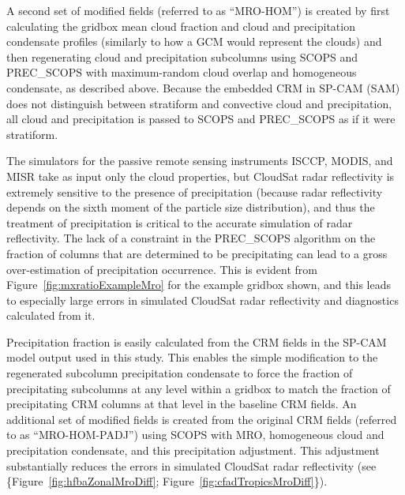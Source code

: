 A second set of modified fields (referred to as ``MRO-HOM'') is created
by first calculating the gridbox mean cloud fraction and cloud and
precipitation condensate profiles (similarly to how a GCM would
represent the clouds) and then regenerating cloud and precipitation
subcolumns using SCOPS and PREC\_SCOPS with maximum-random cloud overlap
and homogeneous condensate, as described above. Because the embedded CRM
in SP-CAM (SAM) does not distinguish between stratiform and convective
cloud and precipitation, all cloud and precipitation is passed to SCOPS
and PREC\_SCOPS as if it were stratiform.

The simulators for the passive remote sensing instruments ISCCP, MODIS,
and MISR take as input only the cloud properties, but CloudSat radar
reflectivity is extremely sensitive to the presence of precipitation
(because radar reflectivity depends on the sixth moment of the particle
size distribution), and thus the treatment of precipitation is critical
to the accurate simulation of radar reflectivity. The lack of a
constraint in the PREC\_SCOPS algorithm on the fraction of columns that
are determined to be precipitating can lead to a gross over-estimation
of precipitation occurrence. This is evident from
Figure~\ref{fig:mxratioExampleMro} for the example gridbox shown, and
this leads to especially large errors in simulated CloudSat radar
reflectivity and diagnostics calculated from it.

Precipitation fraction is easily calculated from the CRM fields in the
SP-CAM model output used in this study. This enables the simple
modification to the regenerated subcolumn precipitation condensate to
force the fraction of precipitating subcolumns at any level within a
gridbox to match the fraction of precipitating CRM columns at that level
in the baseline CRM fields. An additional set of modified fields is
created from the original CRM fields (referred to as ``MRO-HOM-PADJ'')
using SCOPS with MRO, homogeneous cloud and precipitation condensate,
and this precipitation adjustment. This adjustment substantially reduces
the errors in simulated CloudSat radar reflectivity (see
\{Figure~\ref{fig:hfbaZonalMroDiff};
Figure~\ref{fig:cfadTropicsMroDiff}\}).

